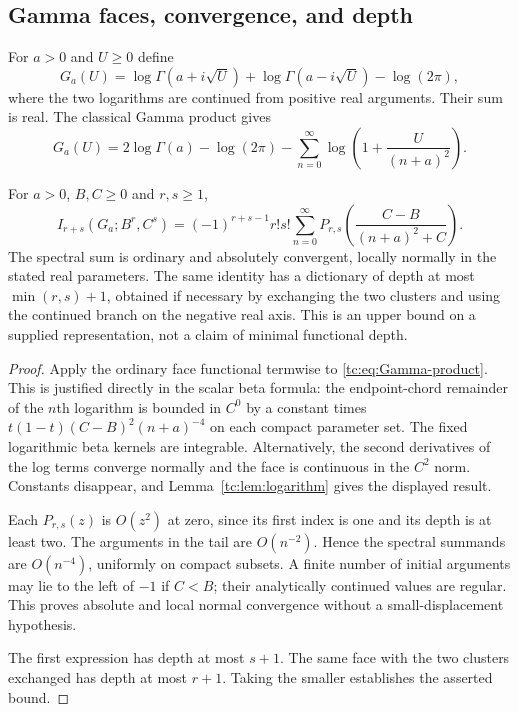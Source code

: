 \subsection{Gamma faces, convergence, and depth}

For $a>0$ and $U\ge0$ define
\begin{equation}\label{tc:eq:G}
 G_a(U)=\log\Gamma(a+i\sqrt U)+\log\Gamma(a-i\sqrt U)
                      -\log(2\pi),
\end{equation}
where the two logarithms are continued from positive real arguments.
Their sum is real.  The classical Gamma product
\cite{dlmfgamma} gives
\begin{equation}\label{tc:eq:Gamma-product}
 G_a(U)=2\log\Gamma(a)-\log(2\pi)
          -\sum_{n=0}^{\infty}
                    \log\left(1+\frac{U}{(n+a)^2}\right).
\end{equation}

\begin{theorem}
\label{tc:thm:Gamma}
For $a>0$, $B,C\ge0$ and $r,s\ge1$,
\begin{equation}\label{tc:eq:Gamma-dictionary}
 \boxed{\displaystyle
 I_{r+s}(G_a;B^r,C^s)
   =(-1)^{r+s-1}r!s!
      \sum_{n=0}^{\infty}
       P_{r,s}\!\left(\frac{C-B}{(n+a)^2+C}\right).}
\end{equation}
The spectral sum is ordinary and absolutely convergent, locally
normally in the stated real parameters.  The same identity has a
dictionary of depth at most $\min(r,s)+1$, obtained if necessary by
exchanging the two clusters and using the continued branch on
the negative real axis.  This is an upper bound on a supplied
representation, not a claim of minimal functional depth.
\end{theorem}

\begin{proof}
Apply the ordinary face functional termwise to
\eqref{tc:eq:Gamma-product}.  This is justified directly in the
scalar beta formula: the endpoint-chord remainder of the $n$th
logarithm is bounded in $C^0$ by a constant times
$t(1-t)(C-B)^2(n+a)^{-4}$ on each compact parameter set.
The fixed logarithmic beta kernels are integrable.  Alternatively,
the second derivatives of the log terms converge normally and the
face is continuous in the $C^2$ norm.  Constants disappear, and
Lemma~\ref{tc:lem:logarithm} gives the displayed result.

Each $P_{r,s}(z)$ is $O(z^2)$ at zero, since its first index is one
and its depth is at least two.  The arguments in the tail are
$O(n^{-2})$.  Hence the spectral summands are $O(n^{-4})$,
uniformly on compact subsets.  A finite number of initial arguments
may lie to the left of $-1$ if $C<B$; their analytically continued
values are regular.  This proves absolute and local normal
convergence without a small-displacement hypothesis.

The first expression has depth at most $s+1$.
The same face with the two clusters exchanged has depth at most
$r+1$.  Taking the smaller establishes the asserted bound.
\end{proof}

